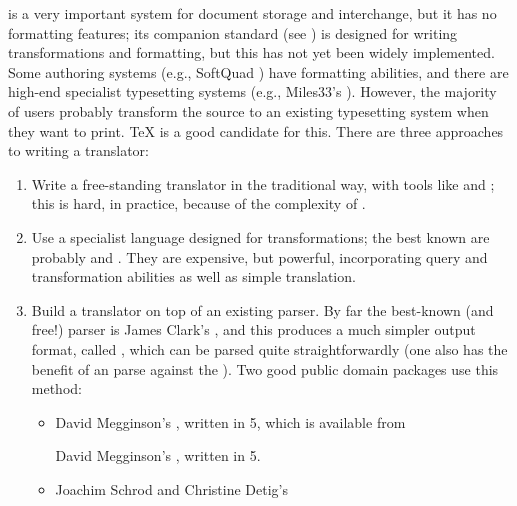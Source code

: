  is a very important system for document storage and interchange,
but it has no formatting features; its companion  standard
(see ) is designed for writing
transformations and formatting,
but this has not yet been widely implemented. Some  authoring
systems (e.g., SoftQuad ) have formatting
abilities, and
there are high-end specialist  typesetting systems (e.g., Miles33's
).  However, the majority of  users probably transform
the source to an existing typesetting system when they want to print. 
\TeX{} is a good candidate for this. There are three approaches to writing a
translator:
\begin{enumerate}
\item Write a free-standing translator in the traditional way, with
  tools like  and ; this is hard, in
  practice, because of the complexity of .
\item Use a specialist language designed for  transformations; the
  best known are probably  and .
  They are expensive, but powerful, incorporating  query and
  transformation abilities as well as simple translation.
\item Build a translator on top of an existing  parser.  By far
  the best-known (and free!) parser is James Clark's
  , and this produces a much simpler output format,
  called , which can be parsed quite straightforwardly (one also
  has the benefit of an  parse against the ). Two
  good public domain packages use this method:
  \begin{itemize}
  \item
\begin{narrowversion} %
      David Megginson's , written in 
      5, which is available from 
\end{narrowversion}
\begin{wideversion}
      David Megginson's
      \href{http://www.perl.com/CPAN/modules/by-module/SGMLS}{},
      written in  5.
\end{wideversion}
    \item
\begin{narrowversion} %
      Joachim Schrod and Christine Detig's 

\end{narrowversion}
\end{itemize}
\end{enumerate}
